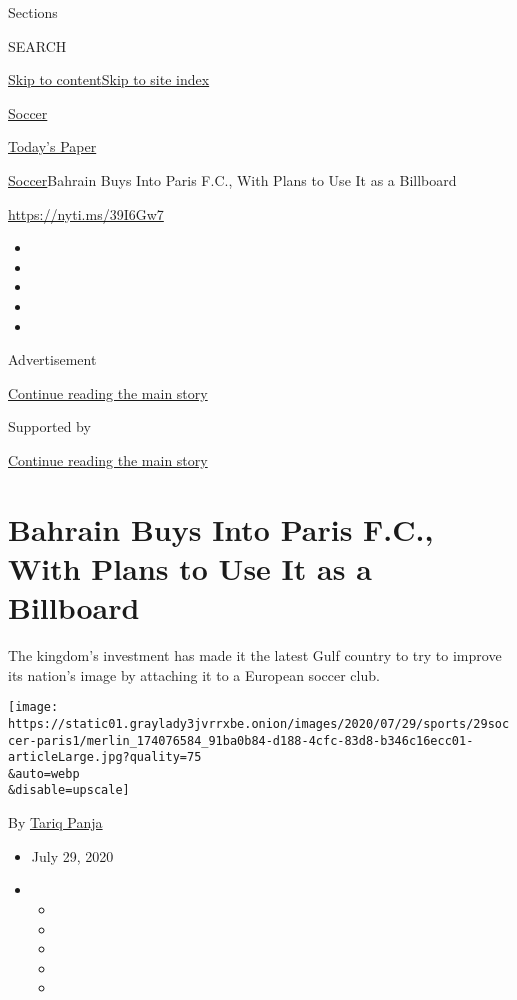 Sections

SEARCH

\protect\hyperlink{site-content}{Skip to
content}\protect\hyperlink{site-index}{Skip to site index}

\href{https://www.nytimes3xbfgragh.onion/section/sports/soccer}{Soccer}

\href{https://myaccount.nytimes3xbfgragh.onion/auth/login?response_type=cookie\&client_id=vi}{}

\href{https://www.nytimes3xbfgragh.onion/section/todayspaper}{Today's
Paper}

\href{/section/sports/soccer}{Soccer}\textbar{}Bahrain Buys Into Paris
F.C., With Plans to Use It as a Billboard

\url{https://nyti.ms/39I6Gw7}

\begin{itemize}
\item
\item
\item
\item
\item
\end{itemize}

Advertisement

\protect\hyperlink{after-top}{Continue reading the main story}

Supported by

\protect\hyperlink{after-sponsor}{Continue reading the main story}

\hypertarget{bahrain-buys-into-paris-fc-with-plans-to-use-it-as-a-billboard}{%
\section{Bahrain Buys Into Paris F.C., With Plans to Use It as a
Billboard}\label{bahrain-buys-into-paris-fc-with-plans-to-use-it-as-a-billboard}}

The kingdom's investment has made it the latest Gulf country to try to
improve its nation's image by attaching it to a European soccer club.

\texttt{[image: https://static01.graylady3jvrrxbe.onion/images/2020/07/29/sports/29soccer-paris1/merlin\_174076584\_91ba0b84-d188-4cfc-83d8-b346c16ecc01-articleLarge.jpg?quality=75\\\&auto=webp\\\&disable=upscale]}

By \href{https://www.nytimes3xbfgragh.onion/by/tariq-panja}{Tariq Panja}

\begin{itemize}
\item
  July 29, 2020
\item
  \begin{itemize}
  \item
  \item
  \item
  \item
  \item
  \end{itemize}
\end{itemize}

